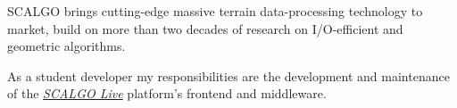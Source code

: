 SCALGO brings cutting-edge massive terrain data-processing technology to market, build on more than two decades of research on I/O-efficient and geometric algorithms.

\medskip

As a student developer my responsibilities are the development and maintenance of the \href{https://scalgo.com/live/}{\emph{SCALGO Live}} platform's frontend and middleware.

